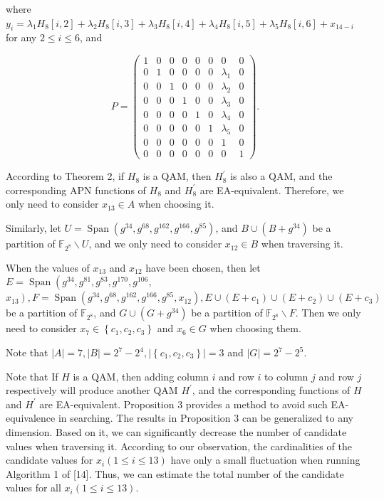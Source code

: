 \documentclass[10pt]{article}
\begin{document}
where $y_{i}=\lambda_{1} H_{8}[i, 2]+\lambda_{2} H_{8}[i, 3]+\lambda_{3} H_{8}[i, 4]+\lambda_{4} H_{8}[i, 5]+\lambda_{5} H_{8}[i, 6]+x_{14-i}$ for any $2 \leq i \leq 6$, and

$$
P=\left(\begin{array}{llllllll}
1 & 0 & 0 & 0 & 0 & 0 & 0 & 0 \\
0 & 1 & 0 & 0 & 0 & 0 & \lambda_{1} & 0 \\
0 & 0 & 1 & 0 & 0 & 0 & \lambda_{2} & 0 \\
0 & 0 & 0 & 1 & 0 & 0 & \lambda_{3} & 0 \\
0 & 0 & 0 & 0 & 1 & 0 & \lambda_{4} & 0 \\
0 & 0 & 0 & 0 & 0 & 1 & \lambda_{5} & 0 \\
0 & 0 & 0 & 0 & 0 & 0 & 1 & 0 \\
0 & 0 & 0 & 0 & 0 & 0 & 0 & 1
\end{array}\right) .
$$

According to Theorem 2, if $H_{8}$ is a QAM, then $H_{8}^{\prime}$ is also a QAM, and the corresponding APN functions of $H_{8}$ and $H_{8}^{\prime}$ are EA-equivalent. Therefore, we only need to consider $x_{13} \in A$ when choosing it.

Similarly, let $U=\operatorname{Span}\left(g^{34}, g^{68}, g^{162}, g^{166}, g^{85}\right)$, and $B \cup\left(B+g^{34}\right)$ be a partition of $\mathbb{F}_{2^{8}} \backslash U$, and we only need to consider $x_{12} \in B$ when traversing it.

When the values of $x_{13}$ and $x_{12}$ have been chosen, then let $E=\operatorname{Span}\left(g^{34}, g^{81}, g^{83}, g^{170}, g^{106}\right.$, $\left.x_{13}\right), F=\operatorname{Span}\left(g^{34}, g^{68}, g^{162}, g^{166}, g^{85}, x_{12}\right), E \cup\left(E+c_{1}\right) \cup\left(E+c_{2}\right) \cup\left(E+c_{3}\right)$ be a partition of $\mathbb{F}_{2^{8}}$, and $G \cup\left(G+g^{34}\right)$ be a partition of $\mathbb{F}_{2^{8}} \backslash F$. Then we only need to consider $x_{7} \in\left\{c_{1}, c_{2}, c_{3}\right\}$ and $x_{6} \in G$ when choosing them.

Note that $|A|=7,|B|=2^{7}-2^{4},\left|\left\{c_{1}, c_{2}, c_{3}\right\}\right|=3$ and $|G|=2^{7}-2^{5}$.

Note that If $H$ is a QAM, then adding column $i$ and row $i$ to column $j$ and row $j$ respectively will produce another QAM $H^{\prime}$, and the corresponding functions of $H$ and $H^{\prime}$ are EA-equivalent. Proposition 3 provides a method to avoid such EA-equivalence in searching. The results in Proposition 3 can be generalized to any dimension. Based on it, we can significantly decrease the number of candidate values when traversing it. According to our observation, the cardinalities of the candidate values for $x_{i}(1 \leq i \leq 13)$ have only a small fluctuation when running Algorithm 1 of [14]. Thus, we can estimate the total number of the candidate values for all $x_{i}(1 \leq i \leq 13)$.
\end{document}
